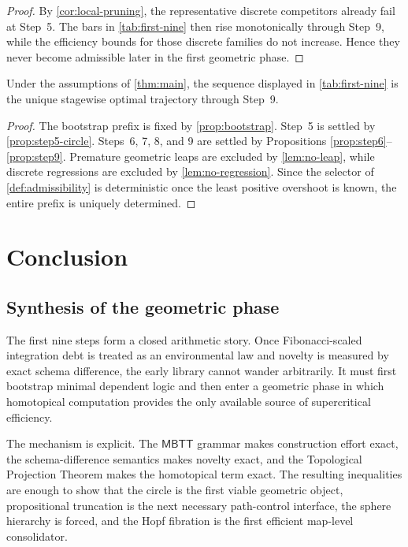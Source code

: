 \documentclass{lmcs}
\newcommand{\MBTT}{\mathsf{MBTT}}
\begin{document}
\begin{proof}
By \autoref{cor:local-pruning}, the representative discrete competitors already fail at Step~5. The bars in \autoref{tab:first-nine} then rise monotonically through Step~9, while the efficiency bounds for those discrete families do not increase. Hence they never become admissible later in the first geometric phase.
\end{proof}

\begin{thm}
\label{thm:stagewise}
Under the assumptions of \autoref{thm:main}, the sequence displayed in \autoref{tab:first-nine} is the unique stagewise optimal trajectory through Step~9.
\end{thm}

\begin{proof}
The bootstrap prefix is fixed by \autoref{prop:bootstrap}. Step~5 is settled by \autoref{prop:step5-circle}. Steps~6, 7, 8, and 9 are settled by Propositions \ref{prop:step6}--\ref{prop:step9}. Premature geometric leaps are excluded by \autoref{lem:no-leap}, while discrete regressions are excluded by \autoref{lem:no-regression}. Since the selector of \autoref{def:admissibility} is deterministic once the least positive overshoot is known, the entire prefix is uniquely determined.
\end{proof}

\section{Conclusion}
\label{sec:conclusion}

\subsection{Synthesis of the geometric phase}

The first nine steps form a closed arithmetic story. Once Fibonacci-scaled integration debt is treated as an environmental law and novelty is measured by exact schema difference, the early library cannot wander arbitrarily. It must first bootstrap minimal dependent logic and then enter a geometric phase in which homotopical computation provides the only available source of supercritical efficiency.

The mechanism is explicit. The $\MBTT$ grammar makes construction effort exact, the schema-difference semantics makes novelty exact, and the Topological Projection Theorem makes the homotopical term exact. The resulting inequalities are enough to show that the circle is the first viable geometric object, propositional truncation is the next necessary path-control interface, the sphere hierarchy is forced, and the Hopf fibration is the first efficient map-level consolidator.
\end{document}
